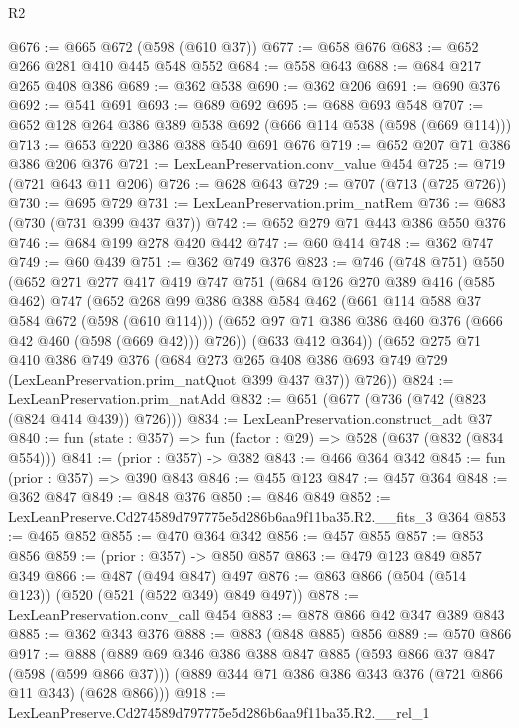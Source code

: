 \begin{lexlean}{R2}
\begin{coremodule}
@676 := @665 @672 (@598 (@610 @37))
@677 := @658 @676
@683 := @652 @266 @281 @410 @445 @548 @552
@684 := @558 @643
@688 := @684 @217 @265 @408 @386
@689 := @362 @538
@690 := @362 @206
@691 := @690 @376
@692 := @541 @691
@693 := @689 @692
@695 := @688 @693 @548
@707 := @652 @128 @264 @386 @389 @538 @692 (@666 @114 @538 (@598 (@669 @114)))
@713 := @653 @220 @386 @388 @540 @691 @676
@719 := @652 @207 @71 @386 @386 @206 @376
@721 := LexLeanPreservation.conv_value @454
@725 := @719 (@721 @643 @11 @206)
@726 := @628 @643
@729 := @707 (@713 (@725 @726))
@730 := @695 @729
@731 := LexLeanPreservation.prim_natRem
@736 := @683 (@730 (@731 @399 @437 @37))
@742 := @652 @279 @71 @443 @386 @550 @376
@746 := @684 @199 @278 @420 @442
@747 := @60 @414
@748 := @362 @747
@749 := @60 @439
@751 := @362 @749 @376
@823 := @746
    (@748 @751)
    @550
    (@652
      @271
      @277
      @417
      @419
      @747
      @751
      (@684
        @126
        @270
        @389
        @416
        (@585 @462)
        @747
        (@652
          @268
          @99
          @386
          @388
          @584
          @462
          (@661 @114 @588 @37 @584 @672 (@598 (@610 @114)))
          (@652 @97 @71 @386 @386 @460 @376 (@666 @42 @460 (@598 (@669 @42))) @726))
        (@633 @412 @364))
      (@652
        @275
        @71
        @410
        @386
        @749
        @376
        (@684 @273 @265 @408 @386 @693 @749 @729 (LexLeanPreservation.prim_natQuot @399 @437 @37))
        @726))
@824 := LexLeanPreservation.prim_natAdd
@832 := @651 (@677 (@736 (@742 (@823 (@824 @414 @439)) @726)))
@834 := LexLeanPreservation.construct_adt @37
@840 := fun (state : @357) => fun (factor : @29) => @528 (@637 (@832 (@834 @554)))
@841 := (prior : @357) -> @382
@843 := @466 @364 @342
@845 := fun (prior : @357) => @390 @843
@846 := @455 @123
@847 := @457 @364
@848 := @362 @847
@849 := @848 @376
@850 := @846 @849
@852 := LexLeanPreserve.Cd274589d797775e5d286b6aa9f11ba35.R2.__fits_3 @364
@853 := @465 @852
@855 := @470 @364 @342
@856 := @457 @855
@857 := @853 @856
@859 := (prior : @357) -> @850 @857
@863 := @479 @123 @849 @857 @349
@866 := @487 (@494 @847) @497
@876 := @863 @866 (@504 (@514 @123)) (@520 (@521 (@522 @349) @849 @497))
@878 := LexLeanPreservation.conv_call @454
@883 := @878 @866 @42 @347 @389 @843
@885 := @362 @343 @376
@888 := @883 (@848 @885) @856
@889 := @570 @866
@917 := @888
    (@889
      @69
      @346
      @386
      @388
      @847
      @885
      (@593 @866 @37 @847 (@598 (@599 @866 @37)))
      (@889 @344 @71 @386 @386 @343 @376 (@721 @866 @11 @343) (@628 @866)))
@918 := LexLeanPreserve.Cd274589d797775e5d286b6aa9f11ba35.R2.__rel_1

\end{coremodule}
\end{lexlean}
